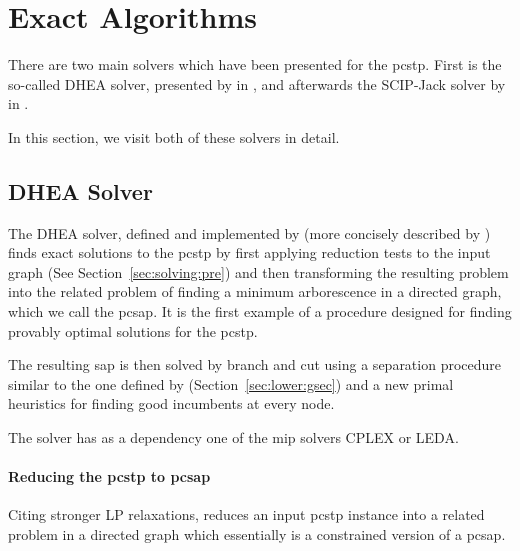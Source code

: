 \clearpage
\section{Exact Algorithms}\label{sec:solving:exact}
There are two main solvers which have been presented for the \gls{pcstp}.
First is the so-called DHEA solver, presented by \citet{ljubic2005solving}
in \citeyear{ljubic2005solving}, and afterwards the SCIP-Jack solver
by \citet{gamrath2017scip} in \citeyear{gamrath2017scip}.

In this section, we visit both of these solvers in detail.
\subsection{DHEA Solver}
\label{sec:exact:dhea}
The DHEA solver, defined and implemented
by \citet{ljubic2005solving}
(more concisely described by \citet{ljubic2006algorithmic}) finds exact solutions to the \gls{pcstp}
by first applying
reduction tests to the input graph (See Section~\ref{sec:solving:pre}) and
then transforming the resulting problem into the related problem of finding a minimum
arborescence in a directed graph, which we call the \gls{pcsap}.
It is the first example of a procedure designed for
finding provably optimal solutions for the \gls{pcstp}.

The resulting \gls{sap} is then solved by branch and cut using a separation procedure
similar to the one defined by \citet{lucena2004strong}
(Section~\ref{sec:lower:gsec}) and a new primal heuristics for
finding good incumbents at every node.

The solver has as a dependency one of the \gls{mip} solvers CPLEX or LEDA.
 \paragraph{Reducing the \gls{pcstp} to \gls{pcsap}}
 Citing stronger LP relaxations, \citet{ljubic2005solving} reduces an input \gls{pcstp} instance
 into a related problem in a directed graph which essentially is a constrained version
 of a \gls{pcsap}.

